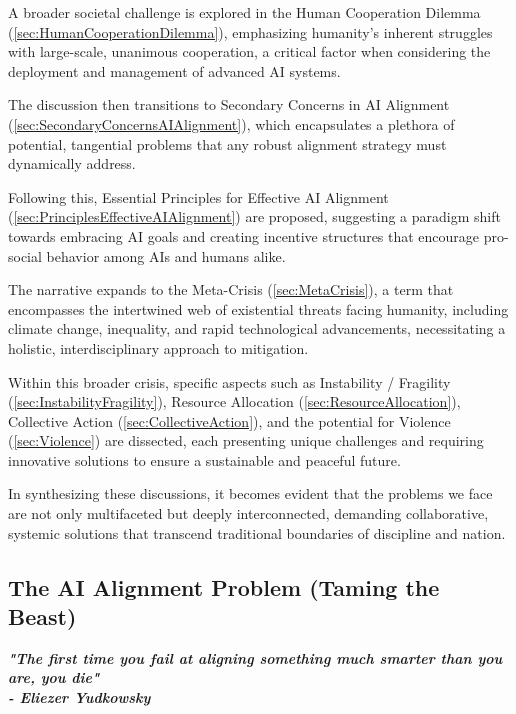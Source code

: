 \documentclass{article}
\begin{document}
A broader societal challenge is explored in the Human Cooperation Dilemma (\ref{sec:HumanCooperationDilemma}), emphasizing humanity's inherent struggles with large-scale, unanimous cooperation, a critical factor when considering the deployment and management of advanced AI systems.

The discussion then transitions to Secondary Concerns in AI Alignment (\ref{sec:SecondaryConcernsAIAlignment}), which encapsulates a plethora of potential, tangential problems that any robust alignment strategy must dynamically address.

Following this, Essential Principles for Effective AI Alignment (\ref{sec:PrinciplesEffectiveAIAlignment}) are proposed, suggesting a paradigm shift towards embracing AI goals and creating incentive structures that encourage pro-social behavior among AIs and humans alike.

The narrative expands to the Meta-Crisis (\ref{sec:MetaCrisis}), a term that encompasses the intertwined web of existential threats facing humanity, including climate change, inequality, and rapid technological advancements, necessitating a holistic, interdisciplinary approach to mitigation.

Within this broader crisis, specific aspects such as Instability / Fragility (\ref{sec:InstabilityFragility}), Resource Allocation (\ref{sec:ResourceAllocation}), Collective Action (\ref{sec:CollectiveAction}), and the potential for Violence (\ref{sec:Violence}) are dissected, each presenting unique challenges and requiring innovative solutions to ensure a sustainable and peaceful future.

In synthesizing these discussions, it becomes evident that the problems we face are not only multifaceted but deeply interconnected, demanding collaborative, systemic solutions that transcend traditional boundaries of discipline and nation.


\subsection{The AI Alignment Problem (Taming the Beast)}
\label{sec:AIAlignmentProblem}

\noindent \begin{center}\begin{minipage}[t]{0.9\columnwidth}
    \textbf{\textit{"The first time you fail at aligning something much smarter than you are, you die"}}\\
    \textbf{\textit{- Eliezer Yudkowsky}}
\end{minipage}\end{center}
\vspace{0.05in}
\end{document}
